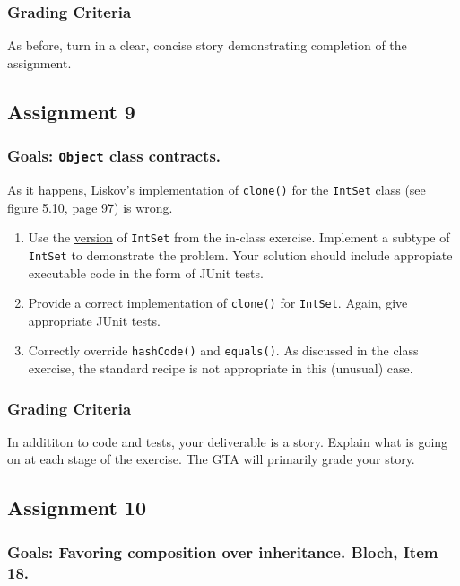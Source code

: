 \documentclass[11pt]{article}
\begin{document}
\subsubsection{Grading Criteria}
\label{sec:org6734936}
As before, turn in a clear, concise story demonstrating completion of the assignment.


\subsection{Assignment 9}
\label{sec:orgf89b975}
\subsubsection{Goals: \texttt{Object} class contracts.}
\label{sec:orgc6a2089}

As it happens, Liskov's implementation of \texttt{clone()} for the \texttt{IntSet} class (see figure 5.10, page 97) is wrong.

\begin{enumerate}
\item Use the \href{./files/IntSet.java}{version} of \texttt{IntSet} from the in-class exercise. Implement a subtype of \texttt{IntSet} to demonstrate the problem. Your solution should include appropiate executable code in the form of JUnit tests.
\item Provide a correct implementation of \texttt{clone()} for \texttt{IntSet}. Again, give appropriate JUnit tests.
\item Correctly override \texttt{hashCode()} and \texttt{equals()}. As discussed in the class exercise, the standard recipe is not appropriate in this (unusual) case.
\end{enumerate}

\subsubsection{Grading Criteria}
\label{sec:org17c1833}
In addititon to code and tests, your deliverable is a story. Explain what is going on at each stage of the exercise. The GTA will primarily grade your story.


\subsection{Assignment 10}
\label{sec:org223d54f}
\subsubsection{Goals: Favoring composition over inheritance. Bloch, Item 18.}
\label{sec:org28cfc93}
\end{document}
